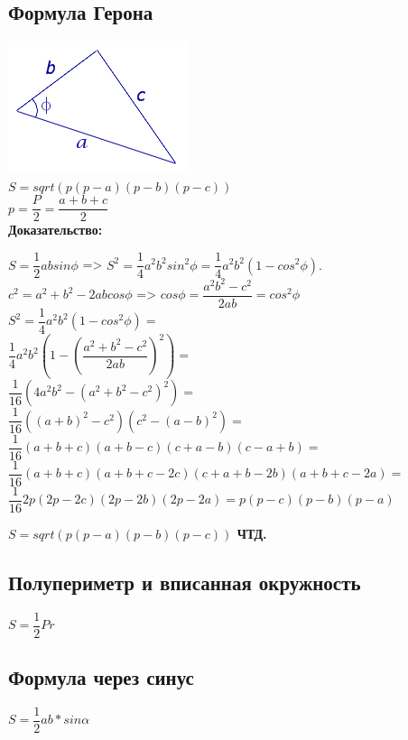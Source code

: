 \documentclass[12pt, letterpaper]{article}
\begin{document}
\subsection {Формула Герона}
\includegraphics[scale=1]{asset.png} \\
$S=sqrt(p(p-a)(p-b)(p-c))$ \\
$p=\dfrac{P}{2}=\dfrac{a+b+c}{2}$ \\
\textbf{Доказательство:} \\
\begin{flushleft}
$S=\dfrac{1}{2}absin\phi$ => $S^2=\dfrac{1}{4}a^2b^2sin^2\phi=\dfrac{1}{4}a^2b^2(1-cos^2\phi).$ \\
$c^2=a^2+b^2-2abcos\phi$ => $cos\phi=\dfrac{a^2b^2-c^2}{2ab}=cos^2\phi$\\
$S^2=\dfrac{1}{4}a^2b^2(1-cos^2\phi)= $ \\
$ \dfrac{1}{4}a^2b^2(1-(\dfrac{a^2+b^2-c^2}{2ab})^2)=$ \\
$ \dfrac{1}{16}(4a^2b^2-(a^2+b^2-c^2)^2)= $ \\
$ \dfrac{1}{16}((a+b)^2-c^2)(c^2-(a-b)^2)= $ \\
$ \dfrac{1}{16}(a+b+c)(a+b-c)(c+a-b)(c-a+b)= $ \\
$ \dfrac{1}{16}(a+b+c)(a+b+c-2c)(c+a+b-2b)(a+b+c-2a)= $ \\ 
$ \dfrac{1}{16}2p(2p-2c)(2p-2b)(2p-2a)= p(p-c)(p-b)(p-a)$ \\
\end{flushleft}
\textbf{$S=sqrt(p(p-a)(p-b)(p-c))$ ЧТД.}

\subsection {Полупериметр и вписанная окружность}
$S=\dfrac{1}{2}Pr$ \\

\subsection{Формула через синус}
$S=\dfrac{1}{2}ab*sin\alpha $ \\
\end{document}
